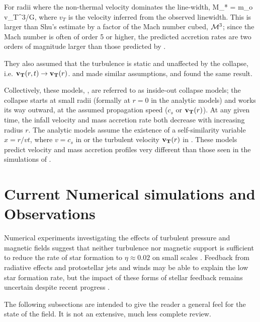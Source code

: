 \documentclass[../dissertation.tex]{subfiles}
\begin{document}
For radii where the non-thermal velocity dominates the line-width, 
%
\be
\dot M_* = m_o v_T^3/G,
\ee
%
where $v_T$ is the velocity inferred from the observed linewidth. 
This is larger than Shu's estimate by a factor of the Mach number cubed, ${\cal M}^3$; since the Mach number is often of order 5 or higher, the predicted accretion rates are two orders of magnitude larger than those predicted by \citet{1977ApJ...214..488S}.

They also assumed that the turbulence is static and unaffected by the collapse, i.e. $\mathbf{v_T} (r,t) \rightarrow \mathbf{v_T} (r)$.  
\citet{1997ApJ...476..750M} and \citet{2003ApJ...585..850M} made similar assumptions, and found the same result.  

Collectively, these models, \citep{1977ApJ...214..488S,1992ApJ...396..631M,1997ApJ...476..750M,2003ApJ...585..850M}, 
are referred to as inside-out collapse models; the collapse starts at small radii (formally at $r=0$ in the analytic models) 
and works its way outward, at the assumed propagation speed ($c_s$ or $\mathbf{v_T} (r)$). 
At any given time, the infall velocity and mass accretion rate both decrease with increasing radius $r$. 
The analytic models assume the existence of a self-similarity variable $x = r/vt$, where $v=c_s$ in 
\citet{1977ApJ...214..488S} or the turbulent velocity $\mathbf{v_T} (r)$ in \citet{1992ApJ...396..631M,1997ApJ...476..750M,2003ApJ...585..850M}.  
These models predict velocity and mass accretion profiles very different than those seen 
in the simulations of \citet{2015ApJ...800...49L}.


\section{Current Numerical simulations and Observations} \label{current_obs}
Numerical experiments investigating the effects of turbulent pressure and magnetic fields suggest that neither turbulence nor magnetic support is sufficient 
to reduce the rate of star formation to $\eta\approx 0.02$ on small scales
\citep{2010ApJ...709...27W,2011MNRAS.410L...8C,2011ApJ...730...40P,2012ApJ...754...71K,2014MNRAS.439.3420M}. 
Feedback from radiative effects and protostellar jets and winds may be able to explain the low star formation rate, 
but the impact of these forms of stellar feedback remains uncertain despite recent progress
\citep{2010ApJ...709...27W,2014MNRAS.439.3420M,2015MNRAS.450.4035F}.

The following subsections are intended to give the reader a general feel for the state of the field. 
It is not an extensive, much less complete review.
\end{document}
